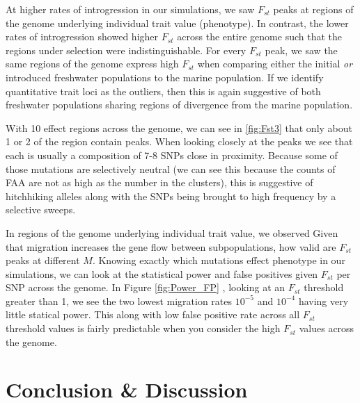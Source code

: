 \documentclass{article}
\begin{document}
At higher rates of introgression in our simulations, we saw $F_{st}$ peaks at regions of the genome underlying individual trait value (phenotype). 
In contrast, the lower rates of introgression showed higher $F_{st}$ across the entire genome such that the regions under selection were indistinguishable. 
For every $F_{st}$ peak, we saw the same regions of the genome express high $F_{st}$ when comparing either the initial \textit{or} introduced freshwater populations to the marine population.
If we identify quantitative trait loci as the outliers, then this is again suggestive of both freshwater populations sharing regions of divergence from the marine population.

With 10 effect regions across the genome, we can see in \ref{fig:Fst3} that only about 1 or 2 of the region contain peaks. 
When looking closely at the peaks we see that each is usually a composition of 7-8 SNPs close in proximity.
Because some of those mutations are selectively neutral (we can see this because the counts of FAA are not as high as the number in the clusters),
this is suggestive of hitchhiking alleles along with the SNPs being brought to high frequency by a selective sweeps.


In regions of the genome underlying individual trait value, we observed 
Given that migration increases the gene flow between subpopulations, how valid are $F_{st}$ peaks at different $M$. 
Knowing exactly which mutations effect phenotype in our simulations, 
we can look at the statistical power and false positives given $F_{st}$ per SNP across the genome. 
In Figure \ref{fig:Power_FP} , looking at an $F_{st}$ threshold greater than 1, we see the two lowest migration rates $10^{-5}$ and $10^{-4}$ having very little statical power. 
This along with low false positive rate across all $F_{st}$ threshold values is fairly predictable when you consider the high $F_{st}$ values across the genome. 


\section{Conclusion \& Discussion}
\end{document}
